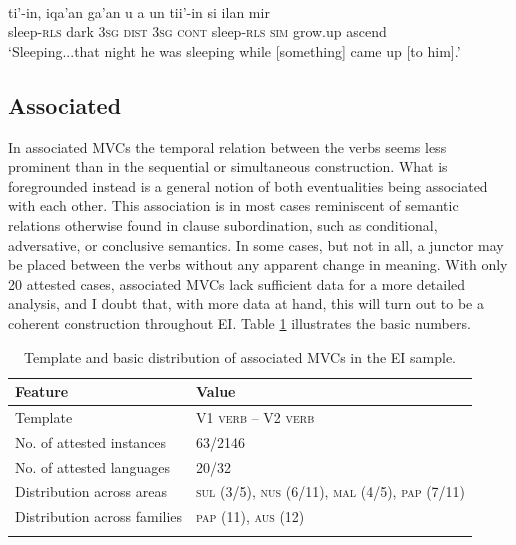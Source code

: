 \ea 
{}\\
\gll ti'-in, iqa'an ga'an u a un tii'-in si ilan mir \\
sleep-\textsc{rls} dark 3\textsc{sg} \textsc{dist} 3\textsc{sg} \textsc{cont} sleep-\textsc{rls} \textsc{sim} grow.up ascend \\
\glft `Sleeping...that night he was sleeping while [something] came up [to him].'\\ 
\z

\subsection{Associated}

In associated MVCs the temporal relation between the verbs seems less prominent than in the sequential or simultaneous construction. What is foregrounded instead is a general notion of both eventualities being associated with each other. This association is in most cases reminiscent of semantic relations otherwise found in clause subordination, such as conditional, adversative, or conclusive semantics. In some cases, but not in all, a junctor may be placed between the verbs without any apparent change in meaning. With only 20 attested cases, associated MVCs lack sufficient data for a more detailed analysis, and I doubt that, with more data at hand, this will turn out to be a coherent construction throughout EI. Table \ref{table:associated} illustrates the basic numbers.

\begin{table}
\begin{tabular}{ll}
\lsptoprule
Feature&Value\tabularnewline
\midrule
Template& V1 \textsc{verb} -- V2 \textsc{verb}\tabularnewline
No. of attested instances& 63/2146 \tabularnewline
No. of attested languages& 20/32 \tabularnewline
Distribution across areas& \textsc{sul} (3/5), \textsc{nus} (6/11), \textsc{mal} (4/5), \textsc{pap} (7/11) \tabularnewline
Distribution across families& \textsc{pap} (11), \textsc{aus} (12) \tabularnewline
\lspbottomrule
\end{tabular}
\caption[Template and basic distribution of associated MVCs]{Template and basic distribution of associated MVCs in the EI sample.}
\label{table:associated}
\end{table}

